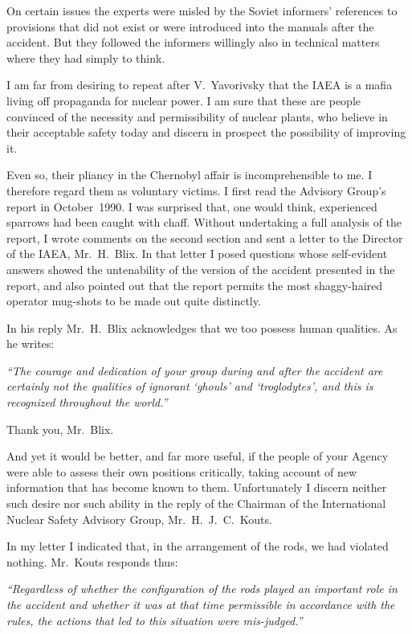 \documentclass[openright]{bookest}
\begin{document}
On certain issues the experts were misled by the Soviet informers' references to provisions that did not exist or were introduced into the manuals after the accident. But they followed the informers willingly also in technical matters where they had simply to think.

I am far from desiring to repeat after V.~Yavorivsky that the IAEA is a mafia living off propaganda for nuclear power. I am sure that these are people convinced of the necessity and permissibility of nuclear plants, who believe in their acceptable safety today and discern in prospect the possibility of improving it.

Even so, their pliancy in the Chernobyl affair is incomprehensible to me. I therefore regard them as voluntary victims. I first read the Advisory Group's report in October~1990. I was surprised that, one would think, experienced sparrows had been caught with chaff. Without undertaking a full analysis of the report, I wrote comments on the second section and sent a letter to the Director of the IAEA, Mr.~H.~Blix. In that letter I posed questions whose self-evident answers showed the untenability of the version of the accident presented in the report, and also pointed out that the report permits the most shaggy-haired operator mug-shots to be made out quite distinctly.

In his reply Mr.~H.~Blix acknowledges that we too possess human qualities. As he writes:

\begin{personal}
\textit{``The courage and dedication of your group during and after the accident are certainly not the qualities of ignorant `ghouls' and `troglodytes', and this is recognized throughout the world.''}
\end{personal}

Thank you, Mr.~Blix.

And yet it would be better, and far more useful, if the people of your Agency were able to assess their own positions critically, taking account of new information that has become known to them. Unfortunately I discern neither such desire nor such ability in the reply of the Chairman of the International Nuclear Safety Advisory Group, Mr.~H.~J.~C.~Kouts.

In my letter I indicated that, in the arrangement of the rods, we had violated nothing. Mr.~Kouts responds thus:

\begin{personal}
\textit{``Regardless of whether the configuration of the rods played an important role in the accident and whether it was at that time permissible in accordance with the rules, the actions that led to this situation were mis-judged.''}
\end{personal}
\end{document}
